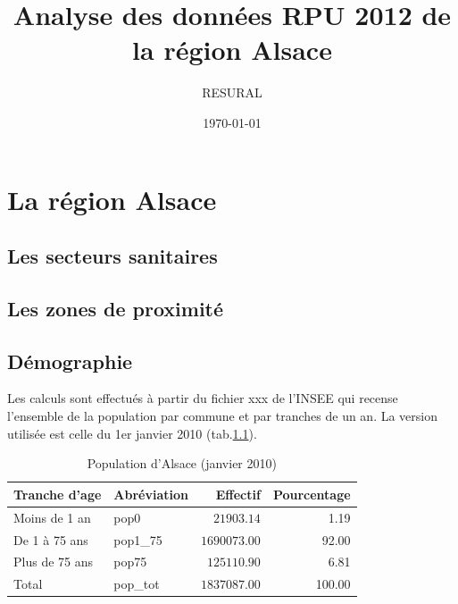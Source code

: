 \documentclass[12pt,english,french]{report}
\begin{document}
 



\title{Analyse des données RPU 2012 de la région Alsace}
\author{RESURAL}
\date{\today}
\maketitle

\tableofcontents
\listoftables
\listoffigures







\chapter{La région Alsace}
\section{Les secteurs sanitaires}
\section{Les zones de proximité}
\section{Démographie}
Les calculs sont effectués à partir du fichier xxx de l'INSEE qui recense l'ensemble de la population par commune et par tranches de un an. La version utilisée est celle du 1er janvier 2010 (tab.\ref{pop}).

\begin{table}
\begin{center}
\begin{tabular}{|l|l|r|r|}
  \hline
  Tranche d'age & Abréviation & Effectif & Pourcentage \\
  \hline
  \hline
  Moins de 1 an & pop0 & $21903.14$ & 1.19 \\
  De 1 à 75 ans & pop1\_75 & $1690073.00$ & 92.00 \\
  Plus de 75 ans& pop75 & $125110.90$ & 6.81 \\
  \hline
  Total & pop\_tot & $1837087.00$ & 100.00 \\
  \hline
\end{tabular}
\caption{Population d'Alsace (janvier 2010)}
\label{pop}
\end{center}
\end{table}
\end{document}
